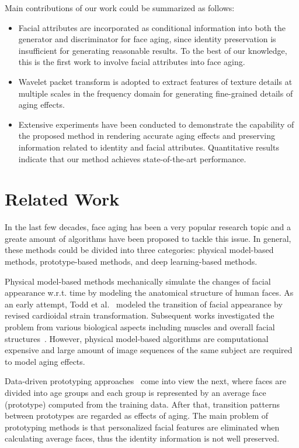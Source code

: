 \documentclass[10pt,twocolumn,letterpaper]{article}
\begin{document}
Main contributions of our work could be summarized as follows:
\begin{itemize}
\item Facial attributes are incorporated as conditional information into both the generator and discriminator for face aging, since identity preservation is insufficient for generating reasonable results. To the best of our knowledge, this is the first work to involve facial attributes into face aging.

\item Wavelet packet transform is adopted to extract features of texture details at multiple scales in the frequency domain for generating fine-grained details of aging effects.

\item Extensive experiments have been conducted to demonstrate the capability of the proposed method in rendering accurate aging effects and preserving information related to identity and facial attributes. Quantitative results indicate that our method achieves state-of-the-art performance.
\end{itemize}

\section{Related Work}
In the last few decades, face aging has been a very popular research topic and a greate amount of algorithms have been proposed to tackle this issue. 
In general, these methods could be divided into three categories: physical model-based methods, prototype-based methods, and deep learning-based methods.

Physical model-based methods mechanically simulate the changes of facial appearance w.r.t. time by modeling the anatomical structure of human faces. 
As an early attempt, Todd et al.~\cite{todd1980perception} modeled the transition of facial appearance by revised cardioidal strain transformation. 
Subsequent works investigated the problem from various biological aspects including muscles and overall facial structures~\cite{lanitis2002toward,tazoe2012facial}. However, physical model-based algorithms are computational expensive and large amount of image sequences of the same subject are required to model aging effects.

Data-driven prototyping approaches~\cite{suo2010compositional,tiddeman2001prototyping,kemelmacher2014illumination} come into view the next, where faces are divided into age groups and each group is represented by an average face (prototype) computed from the training data. After that, transition patterns between prototypes are regarded as effects of aging. 
The main problem of prototyping methods is that personalized facial features are eliminated when calculating average faces, thus the identity information is not well preserved. 
\end{document}
